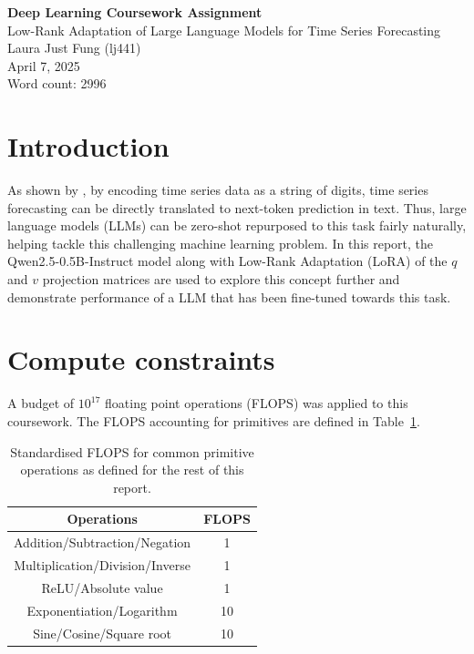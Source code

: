 \documentclass[11pt,a4paper]{article}
\renewcommand{\arraystretch}{0.8}
\begin{document}
 

\begin{center}
    \LARGE{\textbf{Deep Learning Coursework Assignment}}
    \\
    \Large{{Low-Rank Adaptation of Large Language Models for Time Series Forecasting}}
    \\
    \large{Laura Just Fung (lj441)}
    \\
    April 7, 2025
    \\
    Word count: 2996
\end{center}

\section{Introduction}
As shown by \citeauthor{gruver2024largelanguagemodelszeroshot}, by encoding time series data as a string of digits, time series forecasting can be directly translated to next-token prediction in text. Thus, large language models (LLMs) can be zero-shot repurposed to this task fairly naturally, helping tackle this challenging machine learning problem. In this report, the Qwen2.5-0.5B-Instruct model \citep{yang2024qwen2technicalreport} along with Low-Rank Adaptation (LoRA) of the $q$ and $v$ projection matrices are used to explore this concept further and demonstrate performance of a LLM that has been fine-tuned towards this task.

\section{Compute constraints}
\label{sec:constraints}
A budget of $10^{17}$ floating point operations (FLOPS) was applied to this coursework. The FLOPS accounting for primitives are defined in Table~\ref{tab:flops_primitives}.
\renewcommand{\arraystretch}{1.2}
\begin{table}[h]
    \centering
    \begin{tabular}{c|c}
        Operations & FLOPS \\
        \hline
        Addition/Subtraction/Negation & 1 \\
        Multiplication/Division/Inverse & 1 \\
        ReLU/Absolute value & 1 \\
        Exponentiation/Logarithm & 10\\
        Sine/Cosine/Square root & 10 \\
        
    \end{tabular}
    \caption{Standardised FLOPS for common primitive operations as defined for the rest of this report.}
    \label{tab:flops_primitives}
\end{table}
\end{document}

